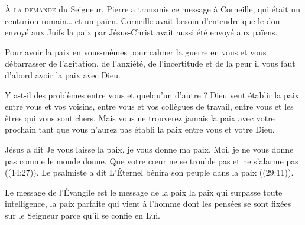 



\lettrine{À}{ la demande} du Seigneur, Pierre a transmis ce message à Corneille,
 qui était un centurion romain\dots{} et un païen.
 Corneille avait besoin d'entendre que le don envoyé aux Juifs
 \ocadr la paix par Jésus-Christ \fcadr{} avait aussi été envoyé aux païens.

Pour avoir la paix en vous-mêmes \ocadr pour calmer la guerre en vous
 et vous débarrasser de l'agitation, de l'anxiété, de l'incertitude
 et de la peur \fcadr{} il vous faut d'abord avoir la paix avec Dieu.


Y a-t-il des problèmes entre vous et quelqu'un d'autre ?
 Dieu veut établir la paix entre vous et vos voisins,
 entre vous et vos collègues de travail,
 entre vous et les êtres qui vous sont chers.
 Mais vous ne trouverez jamais la paix avec votre prochain
 tant que vous n'aurez pas établi la paix entre vous et votre Dieu.

Jésus a dit\frcolon{} 
 \Og Je vous laisse la paix, je vous donne ma paix.
 Moi, je ne vous donne pas comme le monde donne.
 Que votre c\oe{}ur ne se trouble pas et ne s'alarme pas \Fg{}
 ((14:27)).
 Le psalmiste a dit\frcolon{} 
 \Og L'Éternel bénira son peuple dans la paix \Fg{}
 ((29:11)).

Le message de l'Évangile est le message de la paix
 \ocadr la paix qui surpasse toute intelligence,
 la paix parfaite qui vient à l'homme dont les pensées
 se sont fixées sur le Seigneur parce qu'il se confie en Lui.

\dvrule




